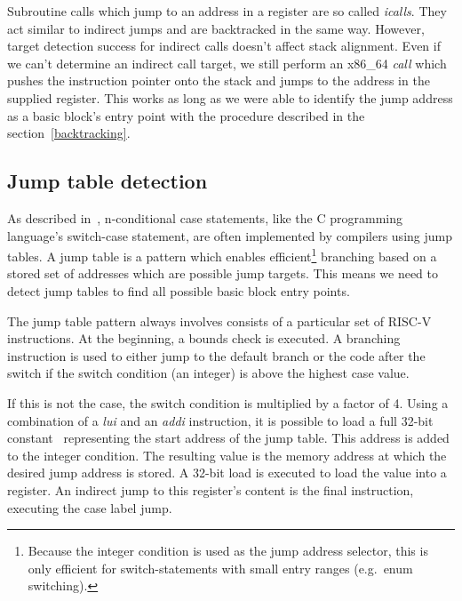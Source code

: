 \documentclass[course=eragp]{aspdoc}
\begin{document}
\par

Subroutine calls which jump to an address in a register are so called \emph{icalls}. They act
similar to indirect jumps and are backtracked in the same way. However, target detection success for indirect calls
doesn't affect stack alignment. Even if we can't determine an indirect call target, we still perform
an x86\_64 \emph{call} which pushes the instruction pointer onto the stack and jumps to the address
in the supplied register. This works as long as we were able to identify the jump address as a basic
block's entry point with the procedure described in the section\ \ref{backtracking}.

\subsection{Jump table detection}

As described in\ \cite{jump_table_paper}, n-conditional case statements, like the C programming
language's switch-case statement, are often implemented by compilers using jump
tables. A jump table is a pattern which enables efficient\footnote{Because the integer condition is
used as the jump address selector, this is only efficient for switch-statements with small entry
ranges (e.g.\ enum switching).} branching based
on a stored set of addresses which are possible jump targets. This means we need to detect jump tables to find
all possible basic block entry points. 

\par

The jump table pattern always involves consists of a particular set of RISC-V instructions.
At the beginning, a bounds check is executed. A branching instruction is used to either jump to the
default branch or the code after the switch if the switch condition (an integer) is above the
highest case value. 

\par 

If this is not the case, the switch condition is multiplied by a factor of 4. 
Using a combination of a \emph{lui} and an \emph{addi} instruction, it is possible to load a full
32-bit constant\ \cite[p.~19]{rvspec} representing the start address of the jump table.
This address is added to the integer condition. The resulting value is the memory address
at which the desired jump address is stored. A 32-bit load is executed to load the value into a
register. An indirect jump to this register's content is the final instruction, executing the case
label jump. 
\end{document}
